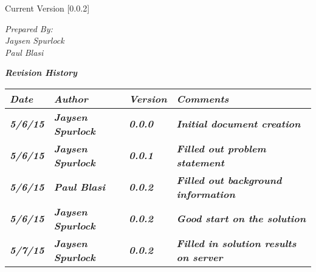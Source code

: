 
Current Version [0.0.2]
\vspace*{5mm}

{\color{MSBlue3}
\noindent
\textit{Prepared By:}\\
\textit{Jaysen Spurlock}\\
\textit{Paul Blasi}
}

\newcommand{\revision}[4]
{
    \textit{\textbf{#1}}
    & \textit{\textbf{#2}}
    & \textit{\textbf{#3}}
    & \textit{\textbf{#4}}
    \tabularnewline\hline
}

\vfill
\noindent
{\color{color02} \textit{\textbf{Revision History}}}\\
\begin{tabular}{|>{\raggedright}p{1.5cm}
                |>{\raggedright}p{3cm}
                |>{\raggedright}p{1.5cm}
                |>{\raggedright}p{9cm}
                |}
\hline

\revision{Date}{Author}{Version}{Comments}
\revision{5/6/15}{Jaysen Spurlock}{0.0.0}{Initial document creation}
\revision{5/6/15}{Jaysen Spurlock}{0.0.1}{Filled out problem statement}
\revision{5/6/15}{Paul Blasi}{0.0.2}{Filled out background information}
\revision{5/6/15}{Jaysen Spurlock}{0.0.2}{Good start on the solution}
\revision{5/7/15}{Jaysen Spurlock}{0.0.2}{Filled in solution results on server}
\end{tabular}
\vfill
